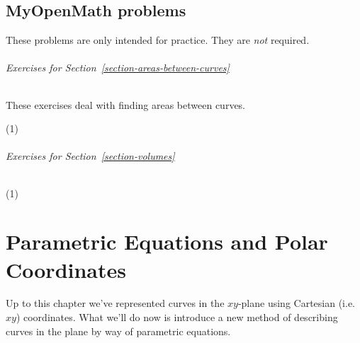 \documentclass[10pt,]{book}
\theoremstyle{ptxplainnotitle}
\theoremstyle{ptxplaintitle}
\theoremstyle{ptxplainnotitle}
\theoremstyle{ptxplaintitle}
\theoremstyle{ptxplainnotitle}
\theoremstyle{ptxplaintitle}
\theoremstyle{ptxdefinitionnotitle}
\theoremstyle{ptxdefinitiontitle}
\theoremstyle{ptxdefinitionnotitle}
\theoremstyle{ptxdefinitiontitle}
\theoremstyle{ptxdefinitionnotitle}
\theoremstyle{ptxdefinitiontitle}
\theoremstyle{ptxdefinitionnotitle}
\theoremstyle{ptxdefinitiontitle}
\theoremstyle{ptxdefinitionnotitle}
\theoremstyle{ptxdefinitiontitle}
\numberwithin{equation}{section}
\begin{document}
\section*{MyOpenMath problems}\label{exercises-1}
\hypertarget{p-649}{}%
These problems are only intended for practice. They are \emph{not} required.%
\subparagraph[{Exercises for Section~\ref*{section-areas-between-curves}}]{Exercises for Section~\ref*{section-areas-between-curves}}\hypertarget{exercisegroup-1}{}
\par\noindent \hypertarget{p-650}{}%
These exercises deal with finding areas between curves.%
\begin{exercisegroup}(1)
\exercise[1.] \hypertarget{exercise-1}{}

\exercise[2.] \hypertarget{exercise-2}{}

\exercise[3.] \hypertarget{exercise-3}{}

\exercise[4.] \hypertarget{exercise-4}{}

\exercise[5.] \hypertarget{exercise-5}{}

\end{exercisegroup}\par\medskip\noindent
\subparagraph[{Exercises for Section~\ref*{section-volumes}}]{Exercises for Section~\ref*{section-volumes}}\hypertarget{exercisegroup-2}{}
\begin{exercisegroup}(1)
\exercise[6.] \hypertarget{exercise-6}{}

\exercise[7.] \hypertarget{exercise-7}{}

\exercise[8.] \hypertarget{exercise-8}{}

\exercise[9.] \hypertarget{exercise-9}{}

\end{exercisegroup}\par\medskip\noindent
\typeout{************************************************}
\typeout{************************************************}
\chapter[{Parametric Equations and Polar Coordinates}]{Parametric Equations and Polar Coordinates}\label{parametric-polar}
\hypertarget{p-651}{}%
Up to this chapter we've represented curves in the \(xy\)-plane using Cartesian (i.e. \(xy\)) coordinates. What we'll do now is introduce a new method of describing curves in the plane by way of parametric equations.%
\typeout{************************************************}
\typeout{************************************************}
\end{document}

